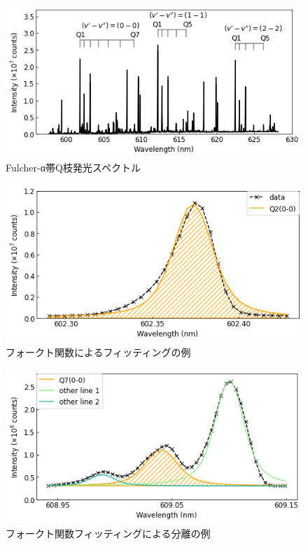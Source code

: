 \begin{figure}
    \centering
    \includegraphics[width=15cm]{pictures/all-spectrum.png}
    \caption{Fulcher-α帯Q枝発光スペクトル}
    \label{fig:all-spectrum}
\end{figure}

\begin{figure}
    \centering
    \includegraphics[width=15cm]{pictures/voigt-fitting-1.png}
    \caption{フォークト関数によるフィッティングの例}
    \label{fig:voigt-fitting-1}
\end{figure}

\begin{figure}
    \centering
    \includegraphics[width=15cm]{pictures/voigt-fitting-2.png}
    \caption{フォークト関数フィッティングによる分離の例}
    \label{fig:voigt-fitting-2}
\end{figure}

